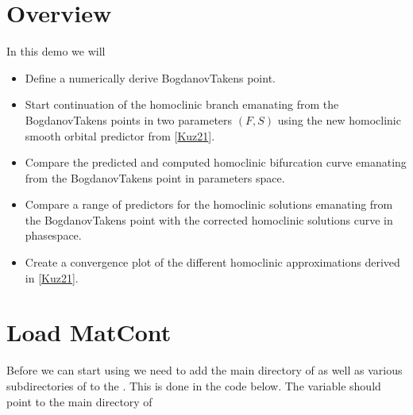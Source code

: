 \documentclass[letterpaper,10pt,english]{jupyterBook}
\begin{document}
\section{Overview}
\label{\detokenize{extendedLorenz84model:overview}}
\sphinxAtStartPar
In this demo we will
\begin{itemize}
\item {} 
\sphinxAtStartPar
Define a numerically derive Bogdanov\sphinxhyphen{}Takens point.

\item {} 
\sphinxAtStartPar
Start continuation of the homoclinic branch emanating from the
Bogdanov\sphinxhyphen{}Takens points in two parameters \((F,S)\) using the new homoclinic
smooth orbital predictor from {[}\hyperlink{cite.references:id3}{Kuz21}{]}.

\item {} 
\sphinxAtStartPar
Compare the predicted and computed homoclinic bifurcation curve emanating
from the Bogdanov\sphinxhyphen{}Takens point in parameters space.

\item {} 
\sphinxAtStartPar
Compare a range of predictors for the homoclinic solutions emanating from the
Bogdanov\sphinxhyphen{}Takens point with the corrected homoclinic solutions curve in
phase\sphinxhyphen{}space.

\item {} 
\sphinxAtStartPar
Create a convergence plot of the different homoclinic approximations
derived in {[}\hyperlink{cite.references:id3}{Kuz21}{]}.

\end{itemize}


\section{Load MatCont}
\label{\detokenize{extendedLorenz84model:load-matcont}}
\sphinxAtStartPar
Before we can start using  we need to add the main directory of
 as well as various subdirectories of  to the . This is done in the code below. The variable 
should point to the main directory of 
\end{document}
